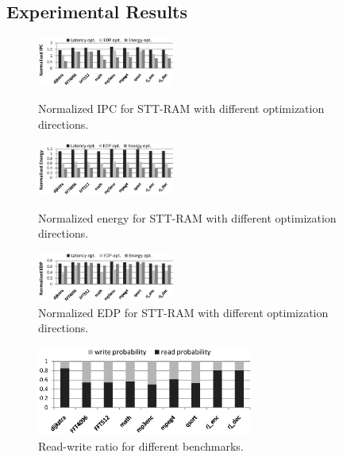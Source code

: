 \subsection{Experimental Results}

\begin{figure}[t]
\centering
\includegraphics[width=0.4\textwidth]{fig/IPC}
\vspace{-10pt}
\caption{Normalized IPC for STT-RAM with different optimization directions.}
\label{fig:ipc}
\vspace{7pt}
\includegraphics[width=0.4\textwidth]{fig/Energy}
\vspace{-10pt}
\caption{Normalized energy for STT-RAM with different optimization directions.}
\label{fig:energy}
\vspace{7pt}
\includegraphics[width=0.4\textwidth]{fig/EDP}
\vspace{-10pt}
\caption{Normalized EDP for STT-RAM with different optimization directions.}
\label{fig:edp}
\vspace{-10pt}
\end{figure}

\begin{figure}[t]
  \centering
  \includegraphics[width=2.8in]{fig/RWratio.eps}
  \caption{Read-write ratio for different benchmarks.}
  \label{fig:ratio}
\vspace{-15pt}
\end{figure}

